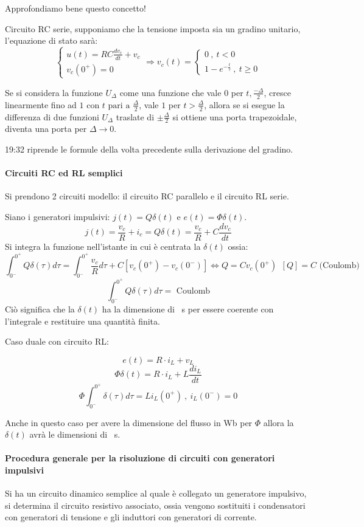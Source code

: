 
Approfondiamo bene questo concetto!

Circuito RC serie, supponiamo che la tensione imposta sia un gradino unitario,
l'equazione di stato sarà:
$$
\begin{cases}
u(t) = RC \frac{dv_c}{dt} + v_c \\
v_c(0^+) = 0
\end{cases}
\Rightarrow v_c(t) = 
\begin{cases}
0\ ,\ t<0 \\
1-e^{-\frac{t}{\tau}}\ ,\ t\geq 0
\end{cases}
$$

Se si considera la funzione $U_\Delta$ come una funzione che vale $0$ per $t , \frac{-\Delta}{2}$, cresce
linearmente fino ad $1 \text{ con $t$ pari a }\frac{\Delta}{2}$, vale $1$ per $t > \frac{\Delta}{2}$,
allora se si esegue la differenza di due funzioni $U_\Delta$ traslate di $\pm\frac{\Delta}{2}$ si ottiene 
una porta trapezoidale, diventa una porta per $\Delta \rightarrow 0$.

19:32 riprende le formule della volta precedente sulla derivazione del gradino.

\paragraph{Circuiti RC ed RL semplici}
Si prendono 2 circuiti modello: il circuito RC parallelo e il circuito RL serie.

Siano i generatori impulsivi: $j(t) = Q\delta(t)$ e $e(t) = \Phi\delta(t)$.
$$
j(t) = \frac{v_c}{R} + i_c = Q\delta(t) = \frac{v_c}{R} + C\frac{dv_c}{dt}
$$
Si integra la funzione nell'istante in cui è centrata la $\delta(t)$ ossia:
$$
\int_{0^-}^{0^+} Q\delta(\tau)d\tau  = \int_{0^-}^{0^+}\frac{v_c}{R}d\tau + C[v_c(0^+)-v_c(0^-)]
\Leftrightarrow Q = Cv_c(0^+) \ \ [Q] = C \text{ (Coulomb)}
$$
$$
\int_{0^-}^{0^+} Q\delta(\tau)d\tau = \text{ Coulomb}
$$
Ciò significa che la $\delta(t)$ ha la dimensione di \si{\per\second} per essere coerente con l'integrale
e restituire una quantità finita.

Caso duale con circuito RL:

$$
e(t) = R\cdot i_L + v_L
$$
$$
\Phi\delta(t) = R\cdot i_L + L\frac{di_L}{dt}
$$
$$
\Phi\int_{0^-}^{0^+} \delta(\tau)d\tau = L i_L(0^+)\ , \ i_L(0^-) = 0
$$

Anche in questo caso per avere la dimensione del flusso in \si{\weber} per $\Phi$ allora la $\delta(t)$ 
avrà le dimensioni di \si{\per\second}.

\paragraph{Procedura generale per la risoluzione di circuiti con generatori impulsivi}
Si ha un circuito dinamico semplice al quale è collegato un generatore impulsivo,
si determina il circuito resistivo associato, ossia vengono sostituiti i condensatori con 
generatori di tensione e gli induttori con generatori di corrente.

